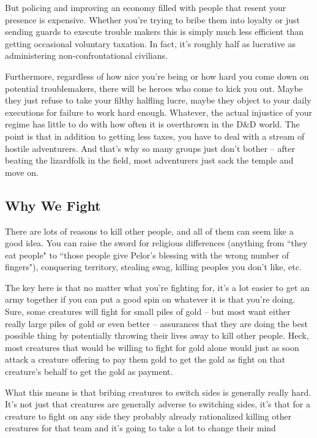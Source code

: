 But policing and improving an economy filled with people that resent your presence is expensive. Whether you're trying to bribe them into loyalty or just sending guards to execute trouble makers this is simply much less efficient than getting occasional voluntary taxation. In fact, it's roughly half as lucrative as administering non-confrontational civilians.

Furthermore, regardless of how nice you're being or how hard you come down on potential troublemakers, there will be heroes who come to kick you out. Maybe they just refuse to take your filthy halfling lucre, maybe they object to your daily executions for failure to work hard enough. Whatever, the actual injustice of your regime has little to do with how often it is overthrown in the D\&D world. The point is that in addition to getting less taxes, you have to deal with a stream of hostile adventurers. And that's why so many groups just don't bother -- after beating the lizardfolk in the field, most adventurers just sack the temple and move on.

\subsection{Why We Fight}
\vspace*{-8pt}

There are lots of reasons to kill other people, and all of them can seem like a good idea. You can raise the sword for religious differences (anything from ``they eat people" to ``those people give Pelor's blessing with the wrong number of fingers"), conquering territory, stealing swag, killing peoples you don't like, etc.

The key here is that no matter what you're fighting for, it's a lot easier to get an army together if you can put a good spin on whatever it is that you're doing. Sure, some creatures will fight for small piles of gold -- but most want either really large piles of gold or even better -- assurances that they are doing the best possible thing by potentially throwing their lives away to kill other people. Heck, most creatures that would be willing to fight for gold alone would just as soon attack a creature offering to pay them gold to get the gold as fight on that creature's behalf to get the gold as payment.

What this means is that bribing creatures to switch sides is generally really hard. It's not just that creatures are generally adverse to switching sides, it's that for a creature to fight on any side they probably already rationalized killing other creatures for that team and it's going to take a lot to change their mind
